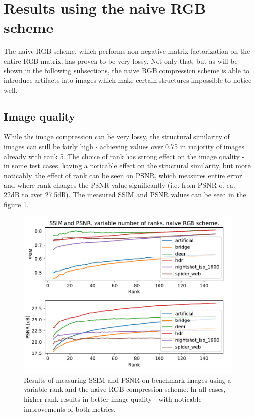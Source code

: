 \documentclass[thesis=M,english]{FITthesis}[2012/10/20]
\begin{document}
\section{Results using the naive RGB scheme}
The naive RGB scheme, which performs non-negative matrix factorization on
the entire RGB matrix, has proven to be very lossy. Not only that, but as
will be shown in the following subsections, the naive RGB compression
scheme is able to introduce artifacts into images which make certain
structures impossible to notice well.

\subsection{Image quality}
While the image compression can be very lossy, the structural similarity of images can still be
fairly high - achieving values over 0.75 in majority of images already with rank 5.
The choice of rank has strong effect on the image quality - in some test cases,
having a noticable effect on the structural similarity, but more noticably, the
effect of rank can be seen on PSNR, which measures entire error and where rank
changes the PSNR value significantly (i.e. from PSNR of ca. 22dB to over 27.5dB).
The measured SSIM and PSNR values can be seen in the figure \ref{fig:psnr_ssim_naive24}.

\begin{figure}[h]
  \centering
  \includegraphics[scale=0.7]{imgs/results/psnr_ssim_naive24}
  \caption[SSIM and PSNR using naive RGB compression scheme]{Results of measuring SSIM and PSNR on benchmark images using
  		 a variable rank and the naive RGB compression scheme. In all cases,
  		 higher rank results in better image quality - with noticable improvements
  		 of both metrics.}
  \label{fig:psnr_ssim_naive24}
\end{figure}
\end{document}
